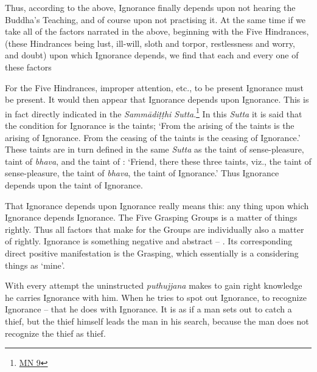 Thus, according to the above, Ignorance finally depends upon not hearing the Buddha's Teaching, and of course upon not practising it. At the same time if we take all of the factors narrated in the above, beginning with the Five Hindrances, (these Hindrances being lust, ill-will, sloth and torpor, restlessness and worry, and doubt) upon which Ignorance depends, we find that each and every one of these factors 

For the Five Hindrances, improper attention, etc., to be present Ignorance must be present. It would then appear that Ignorance depends upon Ignorance. This is in fact directly indicated in the \emph{Sammādiṭṭhi Sutta}.\footnote{\href{https://suttacentral.net/mn9/en/bodhi}{MN 9}} In this \emph{Sutta} it is said that the condition for Ignorance is the taints; `From the arising of the taints is the arising of Ignorance. From the ceasing of the taints is the ceasing of Ignorance.' These taints are in turn defined in the same \emph{Sutta} as the taint of sense-pleasure, taint of \emph{bhava}, and the taint of : `Friend, there these three taints, viz., the taint of sense-pleasure, the taint of \emph{bhava}, the taint of Ignorance.' Thus Ignorance depends upon the taint of Ignorance.

That Ignorance depends upon Ignorance really means this: any thing upon which Ignorance depends  Ignorance. The Five Grasping Groups is a matter of  things rightly. Thus all factors that make for the  Groups are individually also a matter of  rightly. Ignorance is something negative and abstract -- . Its corresponding direct positive manifestation is the Grasping, which essentially is a considering things as `mine'.

With every attempt the uninstructed \emph{puthujjana} makes to gain right knowledge he carries Ignorance with him. When he tries to spot out Ignorance, to recognize Ignorance -- that he does with Ignorance. It is as if a man sets out to catch a thief, but the thief himself leads the man in his search, because the man does not recognize the thief as  thief.

